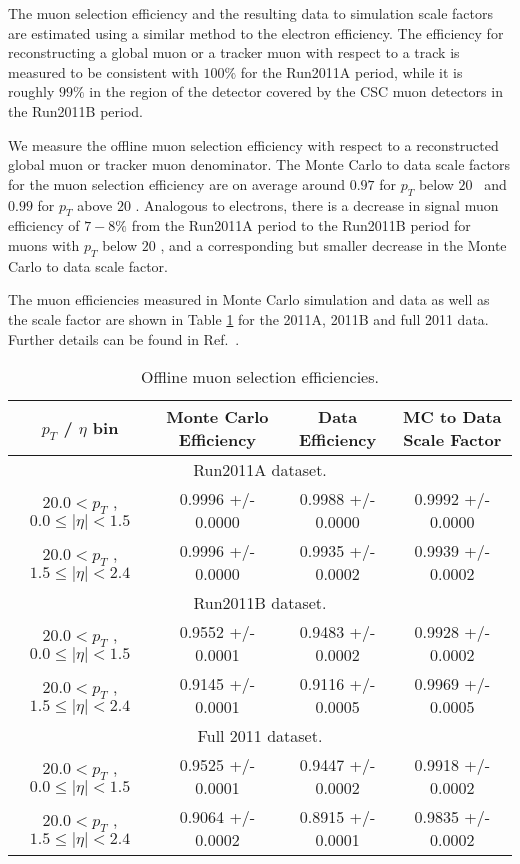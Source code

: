 
The muon selection efficiency and the resulting data to simulation
scale factors are estimated using a similar method to the electron efficiency. 
The efficiency for reconstructing a global muon or a tracker muon with respect
to a track is measured to be consistent with $100\%$ for the Run2011A period, 
while it is roughly $99\%$ in the region of the detector covered by the 
CSC muon detectors in the Run2011B period.

We measure the offline muon selection efficiency with respect to a reconstructed 
global muon or tracker muon denominator. 
The Monte Carlo to data scale factors for the 
muon selection efficiency are on average around $0.97$ for $p_{T}$ below $20$ 
\GeV\ and $0.99$ for $p_{T}$ above $20$ \GeV.  
Analogous to electrons, there is a decrease in signal muon efficiency of $7-8\%$ from the
Run2011A period to the Run2011B period for muons with 
$p_{T}$ below $20$ \GeV, and a corresponding but smaller decrease in the 
Monte Carlo to data scale factor. 

The muon efficiencies measured in Monte Carlo simulation and data as well as the scale
factor are shown in Table \ref{tab:eff_mu_offline} for the 2011A, 2011B and full 2011 data.
Further details can be found in Ref.~\cite{HWW2011Final}.


 \begin{table}[!ht]
 \begin{center}
 \begin{tabular}{|c|c|c|c|}
 \hline
 $p_{T}$ / $\eta$ bin    &  Monte Carlo Efficiency    &  Data Efficiency   &  MC to Data Scale Factor \\   
\hline
\multicolumn{4}{c}{Run2011A dataset.} \\
\hline
$ 20.0 < p_{T} $ , $  0.0  \le |\eta| <   1.5$   &       0.9996 +/- 0.0000   &       0.9988 +/- 0.0000   &       0.9992 +/- 0.0000   \\
\hline
$ 20.0 < p_{T} $ , $  1.5  \le |\eta| <   2.4$   &       0.9996 +/- 0.0000   &       0.9935 +/- 0.0002   &       0.9939 +/- 0.0002   \\
\hline
\multicolumn{4}{c}{Run2011B dataset.} \\
\hline
$ 20.0 < p_{T} $ , $  0.0  \le |\eta| <   1.5$   &       0.9552 +/- 0.0001   &       0.9483 +/- 0.0002   &       0.9928 +/- 0.0002   \\
\hline
$ 20.0 < p_{T} $ , $  1.5  \le |\eta| <   2.4$   &       0.9145 +/- 0.0001   &       0.9116 +/- 0.0005   &       0.9969 +/- 0.0005   \\
\hline
\multicolumn{4}{c}{Full 2011 dataset.} \\
\hline
$ 20.0 < p_{T} $ , $  0.0  \le |\eta| <   1.5$   &       0.9525 +/- 0.0001   &       0.9447 +/- 0.0002   &       0.9918 +/- 0.0002   \\
\hline
$ 20.0 < p_{T} $ , $  1.5  \le |\eta| <   2.4$   &       0.9064 +/- 0.0002   &       0.8915 +/- 0.0001   &       0.9835 +/- 0.0002   \\
\hline
\end{tabular}
\caption{Offline muon selection efficiencies.}
\label{tab:eff_mu_offline}
\end{center}
\end{table}

